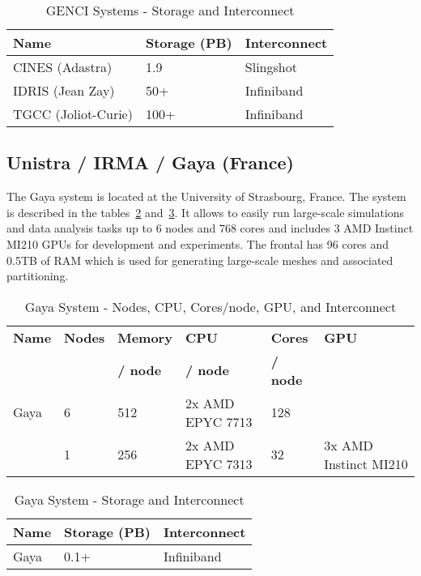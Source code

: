     \begin{table}[h!]
        \centering
        \begin{tabular}{l l l}
        \toprule
        \textbf{Name} & \textbf{Storage (PB)} & \textbf{Interconnect} \\
        \midrule
        CINES (Adastra) & 1.9 & Slingshot \\
        IDRIS (Jean Zay) & 50+ & Infiniband \\
        TGCC (Joliot-Curie) & 100+ & Infiniband \\
        \bottomrule
        \end{tabular}
        \caption{GENCI Systems - Storage and Interconnect}
        \label{tab:genci_storage_interconnect}
    \end{table}

\subsection*{Unistra / IRMA / Gaya (France)}
\label{sec:arch:gaya}

The Gaya system is located at the University of Strasbourg, France. The system is described in the tables~\ref{tab:gaya_flops_cpu_gpu} and~\ref{tab:gaya_storage_interconnect}. It allows to easily run large-scale simulations and data analysis tasks up to 6 nodes and 768 cores and includes 3 AMD Instinct MI210 GPUs for development and experiments.
The frontal has 96 cores and 0.5TB of RAM which is used for generating large-scale meshes and associated partitioning.

\begin{table}[h!]
    \centering
    \begin{tabular}{l l l l l l}
    \toprule
    \textbf{Name} & \textbf{Nodes} & \textbf{Memory} & \textbf{CPU} & \textbf{Cores} & \textbf{GPU} \\
    &  & \textbf{/ node} & \textbf{/ node}  & \textbf{/ node} &  \\
    \midrule
    Gaya &  6  & 512 & 2x AMD EPYC 7713 & 128 &  \\
         &  1 & 256 & 2x AMD EPYC 7313 & 32 & 3x AMD Instinct MI210 \\
    \bottomrule
    \end{tabular}
    \caption{Gaya System - Nodes, CPU, Cores/node, GPU, and Interconnect}
    \label{tab:gaya_flops_cpu_gpu}
\end{table}

    \begin{table}[h!]
        \centering
        \begin{tabular}{l l l}
        \toprule
        \textbf{Name} & \textbf{Storage (PB)} & \textbf{Interconnect} \\
        \midrule
        Gaya & 0.1+ & Infiniband \\
        \bottomrule
    \end{tabular}
    \caption{Gaya System - Storage and Interconnect}
    \label{tab:gaya_storage_interconnect}
    \end{table}

